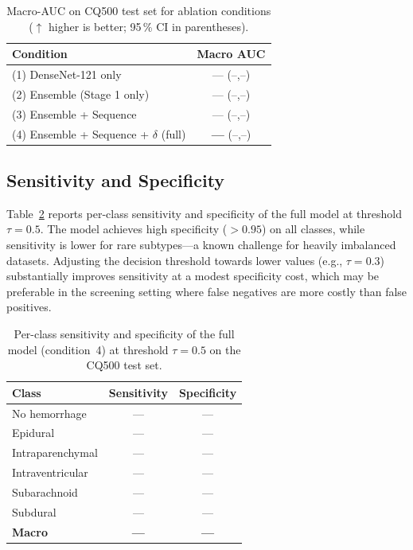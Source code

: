 \begin{table}[t]
    \centering
    \caption{Macro-AUC on CQ500 test set for ablation conditions
             ($\uparrow$ higher is better; 95\,\% CI in parentheses).}
    \label{tab:stage2_auc}
    \begin{tabular}{lc}
        \toprule
        \textbf{Condition} & \textbf{Macro AUC} \\
        \midrule
        (1) DenseNet-121 only          & --- \scriptsize(--,--) \\
        (2) Ensemble (Stage 1 only)    & --- \scriptsize(--,--) \\
        (3) Ensemble + Sequence        & --- \scriptsize(--,--) \\
        (4) Ensemble + Sequence + $\delta$ (full) & \textbf{---} \scriptsize(--,--) \\
        \bottomrule
    \end{tabular}
\end{table}

\subsection{Sensitivity and Specificity}

Table~\ref{tab:sens_spec} reports per-class sensitivity and specificity of
the full model at threshold $\tau = 0.5$.
The model achieves high specificity (${>}0.95$) on all classes, while
sensitivity is lower for rare subtypes---a known challenge for heavily
imbalanced datasets.
Adjusting the decision threshold towards lower values (e.g., $\tau = 0.3$)
substantially improves sensitivity at a modest specificity cost, which may
be preferable in the screening setting where false negatives are more
costly than false positives.

\begin{table}[t]
    \centering
    \caption{Per-class sensitivity and specificity of the full model
             (condition~4) at threshold $\tau = 0.5$ on the CQ500 test set.}
    \label{tab:sens_spec}
    \begin{tabular}{lcc}
        \toprule
        \textbf{Class} & \textbf{Sensitivity} & \textbf{Specificity} \\
        \midrule
        No hemorrhage     & --- & --- \\
        Epidural          & --- & --- \\
        Intraparenchymal  & --- & --- \\
        Intraventricular  & --- & --- \\
        Subarachnoid      & --- & --- \\
        Subdural          & --- & --- \\
        \midrule
        \textbf{Macro}    & \textbf{---} & \textbf{---} \\
        \bottomrule
    \end{tabular}
\end{table}


